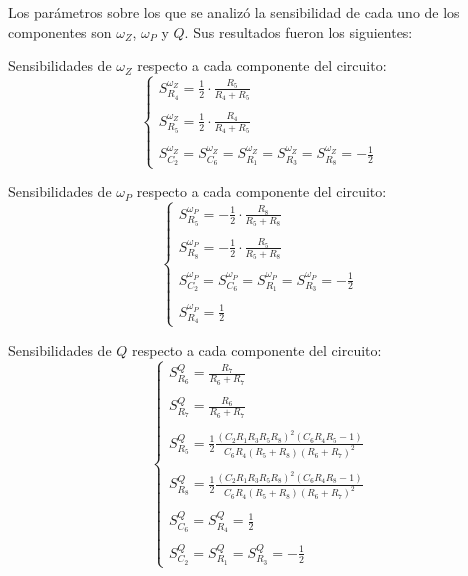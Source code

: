 Los par\'ametros sobre los que se analiz\'o la sensibilidad de cada uno de los componentes son $\omega_Z$, $\omega_P$ y $Q$. Sus resultados fueron los siguientes:

Sensibilidades de $\omega_Z$ respecto a cada componente del circuito:
\begin{equation}
\begin{cases}
S^{\omega_Z}_{R_4}= \frac{1}{2} \cdot \frac{R_{5}}{R_{4} + R_{5}}\\ \\
S^{\omega_Z}_{R_5}= \frac{1}{2} \cdot \frac{R_{4}}{R_{4} + R_{5}}\\ \\
S^{\omega_Z}_{C_2} = S^{\omega_Z}_{C_6}= S^{\omega_Z}_{R_1}=S^{\omega_Z}_{R_3}=S^{\omega_Z}_{R_8}    =- \frac{1}{2} 
\end{cases}
\end{equation}

Sensibilidades de $\omega_P$ respecto a cada componente del circuito:
\begin{equation}
\begin{cases}
S^{\omega_P}_{R_5} =	-  \frac{1}{2} \cdot \frac{R_{8}}{R_{5} + R_{8}} \\ \\
S^{\omega_P}_{R_8} =	-  \frac{1}{2} \cdot \frac{R_{5}}{R_{5} + R_{8}}\\ \\
S^{\omega_P}_{C_2} = S^{\omega_P}_{C_6}= S^{\omega_P}_{R_1}=S^{\omega_P}_{R_3}=	-  \frac{1}{2}\\ \\
S^{\omega_P}_{R_4} = \frac{1}{2}
\end{cases}
\end{equation}

Sensibilidades de $Q$ respecto a cada componente del circuito:
\begin{equation}
\begin{cases}
S^{Q}_{R_6} = \frac{R_{7}}{R_{6} + R_{7}}\\ \\
S^{Q}_{R_7} = \frac{R_{6}}{R_{6} + R_{7}}\\ \\
S^{Q}_{R_5} = \frac{1}{2} \frac{(C_{2} R_{1} R_{3} R_{5} R_{8})^2 \left(C_{6} R_{4} R_{5} - 1\right)}{C_{6} R_{4} \left(R_{5} + R_{8}\right) \left(R_{6} + R_{7}\right)^{2}} \\ \\
S^{Q}_{R_8} = \frac{1}{2} \frac{(C_{2} R_{1} R_{3} R_{5} R_{8})^2 \left(C_{6} R_{4} R_{8} - 1\right)}{C_{6} R_{4} \left(R_{5} + R_{8}\right) \left(R_{6} + R_{7}\right)^{2}} \\ \\
S^{Q}_{C_6} = S^{Q}_{R_4} =\frac{1}{2} \\ \\
S^{Q}_{C_2} = S^{Q}_{R_1} = S^{Q}_{R_3} =-\frac{1}{2}
\end{cases}
\end{equation}

